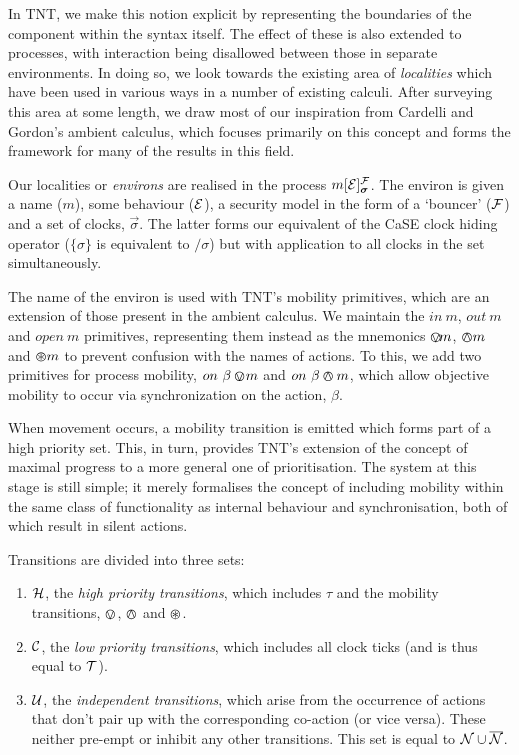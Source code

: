 \documentclass[orivec]{llncs}
\begin{document}
In TNT, we make this notion explicit by representing the boundaries of
the component within the syntax itself.  The effect of these is also
extended to processes, with interaction being disallowed between those
in separate environments.  In doing so, we look towards the existing
area of \emph{localities} \cite{obslocal,pawl} which have been used in
various ways in a number of existing calculi.  After surveying this area
at some length, we draw most of our inspiration from Cardelli and
Gordon's ambient calculus, which focuses primarily on this concept and
forms the framework for many of the results in this field.

Our localities or \emph{environs} are realised in the process
$\locv{m}{\expr}{\exprb}{\vec{\sigma}}$.  The environ is given a name
($m$), some behaviour ($\text{$\mathcal{E}$}$), a security model in the form of a
`bouncer' ($\text{$\mathcal{F}$}$) and a set of clocks, $\vec{\sigma}$.  The latter
forms our equivalent of the CaSE clock hiding operator ($\{ \sigma \}$ is
equivalent to $/ \sigma$) but with application to all clocks in the set
simultaneously.

The name of the environ is used with TNT's mobility primitives, which
are an extension of those present in the ambient calculus.  We maintain
the $in\ m$, $out\ m$ and $open\ m$ primitives, representing them
instead as the mnemonics $\varovee\!m$, $\varowedge m$ and $\varoast m$ to
prevent confusion with the names of actions.  To this, we add two
primitives for process mobility, $on\ \beta \varovee\!m$ and
$on\ \beta \varowedge m$, which allow objective mobility to occur via
synchronization on the action, $\beta$.

When movement occurs, a mobility transition is emitted which forms part of a high
priority set.  This, in turn, provides TNT's extension of the concept of
maximal progress to a more general one of prioritisation.  The system at
this stage is still simple; it merely formalises the concept of
including mobility within the same class of functionality as internal
behaviour and synchronisation, both of which result in silent actions.

Transitions are divided into three sets:

\begin{enumerate}
\item $\text{$\mathcal{H}$}$, the \emph{high priority transitions}, which includes $\tau$ and
      the mobility transitions, $\varovee$, $\varowedge$ and $\varoast$.
\item $\text{$\mathcal{C}$}$, the \emph{low priority transitions}, which includes all
      clock ticks (and is thus equal to $\text{$\mathcal{T}$}$).
\item $\text{$\mathcal{U}$}$, the \emph{independent transitions}, which arise from the
      occurrence of actions that don't pair up with the corresponding
      co-action (or vice versa).  These neither pre-empt or inhibit any
      other transitions.  This set is equal to $\text{$\mathcal{N}$} \cup \text{$\overline{\text{$\mathcal{N}$}}$}$.
\end{enumerate}
\end{document}
